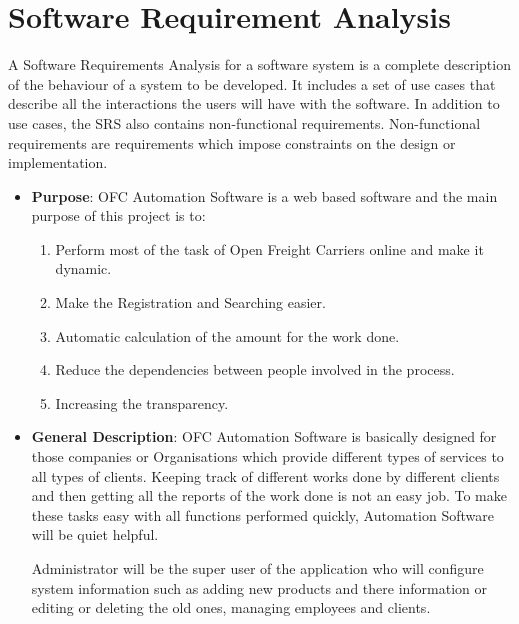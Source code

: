 \section{Software Requirement Analysis}
A Software Requirements Analysis for a software system is a complete 
description of the behaviour of a system to be developed. It includes 
a set of use cases that describe all the interactions the users will 
have with the software. In addition to use cases, the SRS also contains 
non-functional requirements. Non-functional requirements are 
requirements which impose constraints on the design or implementation.
\begin{itemize}
\item{\bf Purpose}: OFC Automation Software is a web based software and the 
main purpose of this project is to:
\begin{enumerate}
\item Perform most of the task of Open Freight Carriers online 
and make it dynamic.
\item Make the Registration and Searching easier.
\item Automatic calculation of the amount for the work done.
\item Reduce the dependencies between people involved in the process.
\item Increasing the transparency.
\end{enumerate}
\item{\bf General Description}: OFC Automation Software is basically 
designed for those companies or Organisations which provide different 
types of services to all types of clients. Keeping track of different 
works done by different clients and then getting all the reports of 
the work done is not an easy job. To make these tasks easy with all 
functions performed quickly, Automation Software will be quiet helpful.

Administrator will be the super user of the application who will 
configure system information such as adding new products and there 
information or editing or deleting the old ones, managing employees 
and clients.


\end{itemize}
